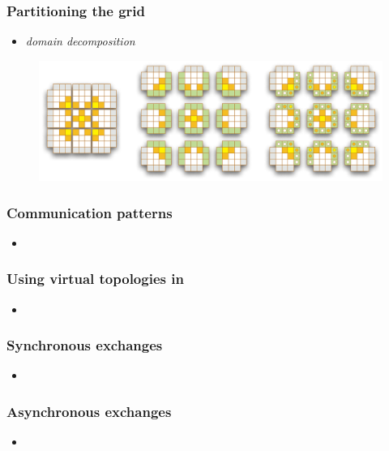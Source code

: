 \begin{frame}[fragile]
%
  \frametitle{Partitioning the grid}
%
  \begin{itemize}
%
  \item {\em domain decomposition}
% 
  \end{itemize}
%
  \begin{figure}
    \includegraphics[scale=0.6]{figures/structured-partitioning.pdf}
  \end{figure} 
%
\end{frame}

\begin{frame}[fragile]
%
  \frametitle{Communication patterns}
%
  \begin{itemize}
%
  \item
% 
  \end{itemize}
%
\end{frame}

\begin{frame}[fragile]
%
  \frametitle{Using virtual topologies in \mpi}
%
  \begin{itemize}
%
  \item
% 
  \end{itemize}
%
\end{frame}

\begin{frame}[fragile]
%
  \frametitle{Synchronous exchanges}
%
  \begin{itemize}
%
  \item
% 
  \end{itemize}
%
\end{frame}

\begin{frame}[fragile]
%
  \frametitle{Asynchronous exchanges}
%
  \begin{itemize}
%
  \item
% 
  \end{itemize}
%
\end{frame}


